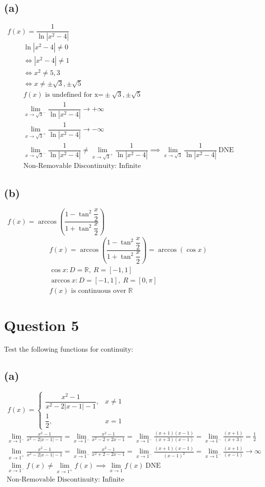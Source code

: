\documentclass[12pt]{article}
\newcommand{\sub}[1]{\subsection{(#1)} \,}
\begin{document}
\subsection{(a)} \, $f(x)=\dfrac{1}{\ln |x^2-4|}$
\begin{gather*}
    \ln |x^2-4| \ne 0\\
    \iff |x^2-4|\ne 1\\
    \iff x^2\ne5,3\\
    \iff x \ne \pm \sqrt{3}, \pm \sqrt{5}\\
    f(x) \text{ is undefined for x=}\pm \sqrt{3}, \pm \sqrt{5}\\
    \lim_{x \to \sqrt{3}^-}\dfrac{1}{\ln |x^2-4|}\to +\infty\\
    \lim_{x \to \sqrt{3}^+}\dfrac{1}{\ln |x^2-4|} \to -\infty\\
    \lim_{x \to \sqrt{3}^-}\dfrac{1}{\ln |x^2-4|} \ne \lim_{x \to \sqrt{3}^+}\dfrac{1}{\ln |x^2-4|} \implies \lim_{x \to \sqrt{3}}\dfrac{1}{\ln |x^2-4|} \ \mathrm{DNE}\\
    \boxed{\text{Non-Removable Discontinuity: Infinite}}
\end{gather*}

\sub{b} $f(x)=\arccos \left( \dfrac{1-\tan^2\dfrac{x}{2}}{1+\tan^2\dfrac{x}{2}} \right) $
\begin{gather*}
    f(x)=\arccos \left( \dfrac{1-\tan^2\dfrac{x}{2}}{1+\tan^2\dfrac{x}{2}} \right)=\arccos (\cos x)\\
    \cos x:D=\mathbb{R}, \ R=[-1,1]\\
    \arccos x: D=[-1 , 1], \ R=[0, \pi]\\
    \boxed{f(x)\text{ is continuous over } \mathbb{R}}
\end{gather*}

\section{Question 5}
Test the following functions for continuity:

\sub{a} $f(x) = 
    \begin{cases} 
    \dfrac{x^2-1}{x^2 - 2|x-1| - 1}, & x \neq 1 \\
    \dfrac{1}{2}, & x = 1
    \end{cases}$
\begin{gather*}
    \lim_{x \to 1^-}\frac{x^2-1}{x^2 - 2|x-1| - 1}= \lim_{x \to 1^-}\frac{x^2-1}{x^2-2+2x-1}=\lim_{x \to 1^-}\frac{(x+1)(x-1)}{(x+3)(x-1)}=\lim_{x \to 1^-}\frac{(x+1)}{(x+3)}=\frac{1}{2}\\
    \lim_{x \to 1^+}\frac{x^2-1}{x^2 - 2|x-1| - 1}= \lim_{x \to 1^-}\frac{x^2-1}{x^2+2-2x-1}=\lim_{x \to 1^-}\frac{(x+1)(x-1)}{(x-1)^2}=\lim_{x \to 1^-}\frac{(x+1)}{(x-1)}\to \infty\\
    \lim_{x \to 1^-} f(x) \ne \lim_{x \to 1^+} f(x) \implies \lim_{x \to 1} f(x) \  \mathrm{DNE}\\
    \boxed{\text{Non-Removable Discontinuity: Infinite}}
\end{gather*}
\end{document}
